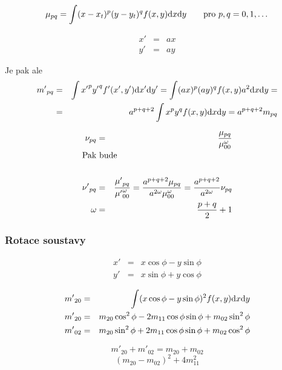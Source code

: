 \begin{equation}
\mu_{pq}=\int (x-x_t)^p(y-y_t)^qf(x,y){\rm d} x{\rm d} y\qquad \hbox{pro $p,q=0,1,\dots$}
\end{equation}




\begin{eqnarray}
x'&=&ax\nonumber\\
y'&=&ay
\end{eqnarray}

Je pak ale
\begin{eqnarray}
{m'}_{pq}&=&\int {x'}^p{y'}^q{f'}(x',y'){\rm d} x'{\rm d} y'=\int (ax)^p(ay)^qf(x,y)a^2{\rm d} x{\rm d} y=\nonumber\\
&=&a^{p+q+2}\int x^py^qf(x,y){\rm d} x{\rm d} y=a^{p+q+2} m_{pq}\\
\end{eqnarray}

\begin{eqnarray}
\nu_{pq}&=&\frac{\mu_{pq}}{\mu^\omega_{00}}\\
\noalign{\hbox{Pak bude}\nonumber}\\
{\nu'}_{pq}&=&\frac{{\mu'}_{pq}} {{\mu'}^\omega_{00}}=\frac{a^{p+q+2}\mu_{pq}}{a^{2\omega}\mu^\omega_{00}}=
\frac{a^{p+q+2}}{a^{2\omega}}\nu_{pq}\nonumber\\
\omega&=&\frac{p+q}{2}+1
\end{eqnarray}


\subsubsection{Rotace soustavy}
\begin{eqnarray}
x'&=&x\cos\phi-y\sin\phi\nonumber\\
y'&=&x\sin\phi+y\cos\phi
\end{eqnarray}

\begin{eqnarray}
{m'}_{20}&=&\int(x\cos\phi-y\sin\phi)^2f(x,y){\rm d} x{\rm d} y\\
{m'}_{20}&=& m_{20}\cos^2\phi-2m_{11}\cos\phi\sin\phi +m_{02}\sin^2\phi \\
{m'}_{02}&=& m_{20}\sin^2\phi+2m_{11}\cos\phi\sin\phi +m_{02}\cos^2\phi 
\end{eqnarray}

\begin{equation}
{m'}_{20}+{m'}_{02}=m_{20}+m_{02}
\end{equation}
\begin{equation}
(m_{20}-m_{02})^2+4m^2_{11}
\end{equation}


